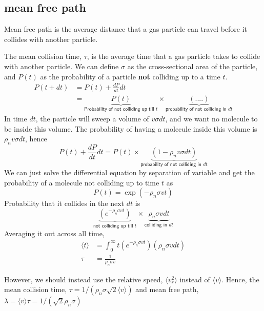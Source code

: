 \subsection{mean free path}
Mean free path is the average distance that a gas particle can travel before it collides with another particle. 

The mean collision time, $\tau$, is the average time that a gas particle takes to collide with another particle. We can define $\sigma$ as the cross-sectional area of the particle, and $P(t)$ as the probability of a particle \textbf{not} colliding up to a time $t$. 
\begin{align}
    P(t+dt)&=P(t)+\frac{dP}{dt}dt \nonumber \\
    &= \underbrace{P(t)}_{\textsf{Probability of not colliding up till $t$}} \times \underbrace{(....)}_{\textsf{probability of not colliding in $dt$}}
\end{align} 
In time $dt$, the particle will sweep a volume of $v\sigma dt$, and we want no molecule to be inside this volume. The probability of having a molecule inside this volume is $\rho_n v \sigma dt$, hence
\begin{equation}
    P(t)+\frac{dP}{dt}dt=P(t)\times\underbrace{(1-\rho_n v\sigma dt)}_{\textsf{probability of not colliding in $dt$}}
\end{equation}
We can just solve the differential equation by separation of variable and get the probability of a molecule not colliding up to time $t$ as
\begin{equation}
    P(t)=\exp(-\rho_n \sigma v t)
\end{equation}
Probability that it collides in the next $dt$ is 
\begin{equation}
    \underbrace{(e^{-\rho_n \sigma v t})}_{\textsf{not colliding up till $t$}} \times \underbrace{\rho_n \sigma v dt}_{\textsf{colliding in $dt$}} 
\end{equation}
Averaging it out across all time,
\begin{align}
    \langle t \rangle &= \int_0^{\infty}t(e^{-\rho_n \sigma v t})(\rho_n \sigma v dt) \nonumber \\
    \tau &= \frac{1}{\rho_n \sigma v}
\end{align}

However, we should instead use the relative speed, ${\langle v_r ^2 \rangle}$ instead of ${\langle v \rangle}$. Hence, the mean collision time, $\tau = 1/(\rho_n \sigma \sqrt{2}{\langle v \rangle})$ and mean free path, $\lambda={\langle v \rangle}\tau=1/(\sqrt{2}\rho_n\sigma)$

